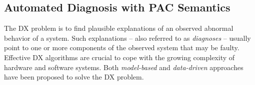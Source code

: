 \documentclass[12pt]{article}
\begin{document}
\subsection{Automated Diagnosis with PAC Semantics}


The DX problem is to find plausible explanations of an observed abnormal behavior of a system. Such explanations -- also referred to as {\em diagnoses} -- usually point to one or more components of the observed system that may be faulty. 
Effective DX algorithms are crucial to cope with the growing complexity of hardware and software systems. 
Both  {\em model-based} and {\em data-driven} approaches have been proposed to solve the DX problem. 
\end{document}
